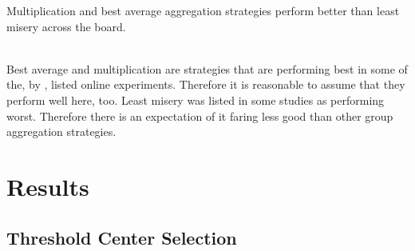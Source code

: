 \begin{hypothesis}
    \begin{itshape}
        \label{hyp:Evaluation:AggregationStrategies} Multiplication and best average aggregation strategies perform better than least misery across the board.
    \end{itshape} \medskip \\
    Best average and multiplication are strategies that are performing best in some of the, by \citeauthor{Masthoff2015} \cite[p. 755f]{Masthoff2015}, listed online experiments. Therefore it is reasonable to assume that they perform well here, too. Least misery was listed in some studies as performing worst. Therefore there is an expectation of it faring less good than other group aggregation strategies.
\end{hypothesis}

\section{Results}
\label{sec:Evaluation:Findings}

\subsection{Threshold Center Selection}

